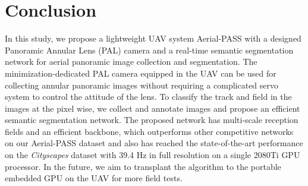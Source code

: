 \documentclass[letterpaper, 10 pt, conference]{ieeeconf}
\begin{document}
\section{Conclusion}

In this study, we propose a lightweight UAV system Aerial-PASS with a designed Panoramic Annular Lens (PAL) camera and a real-time semantic segmentation network for aerial panoramic image collection and segmentation.
The minimization-dedicated PAL camera equipped in the UAV can be used for collecting annular panoramic images without requiring a complicated servo system to control the attitude of the lens.
To classify the track and field in the images at the pixel wise, we collect and annotate  images and propose an efficient semantic segmentation network.
The proposed network has multi-scale reception fields and an efficient backbone, which outperforms other competitive networks on our Aerial-PASS dataset and also has reached the state-of-the-art performance on the \emph{Cityscapes} dataset with 39.4 Hz in full resolution on a single 2080Ti GPU processor.
In the future, we aim to transplant the algorithm to the portable embedded GPU on the UAV for more field tests.



\end{document}
